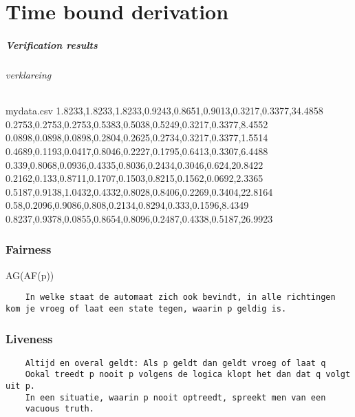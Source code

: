  
 
 
 
 
 \chapter{Time bound derivation}
 
 
 \paragraph{Verification results}
 
 
 
 
 
 
 \subparagraph{verklareing}
 
 
 \begin{filecontents*}{mydata.csv}
 	1.8233,1.8233,1.8233,0.9243,0.8651,0.9013,0.3217,0.3377,34.4858
 	0.2753,0.2753,0.2753,0.5383,0.5038,0.5249,0.3217,0.3377,8.4552
 	0.0898,0.0898,0.0898,0.2804,0.2625,0.2734,0.3217,0.3377,1.5514
 	0.4689,0.1193,0.0417,0.8046,0.2227,0.1795,0.6413,0.3307,6.4488
 	0.339,0.8068,0.0936,0.4335,0.8036,0.2434,0.3046,0.624,20.8422
 	0.2162,0.133,0.8711,0.1707,0.1503,0.8215,0.1562,0.0692,2.3365
 	0.5187,0.9138,1.0432,0.4332,0.8028,0.8406,0.2269,0.3404,22.8164
 	0.58,0.2096,0.9086,0.808,0.2134,0.8294,0.333,0.1596,8.4349
 	0.8237,0.9378,0.0855,0.8654,0.8096,0.2487,0.4338,0.5187,26.9923 
 \end{filecontents*}
 
 \subsection{Fairness}
 AG(AF(p))
 \begin{verbatim}
 	In welke staat de automaat zich ook bevindt, in alle richtingen kom je vroeg of laat een state tegen, waarin p geldig is.
 \end{verbatim}
 \subsection{Liveness}
 \begin{verbatim}
 	Altijd en overal geldt: Als p geldt dan geldt vroeg of laat q
 	Ookal treedt p nooit p volgens de logica klopt het dan dat q volgt uit p.
 	In een situatie, waarin p nooit optreedt, spreekt men van een
 	vacuous truth.
 \end{verbatim}
 
 
 
